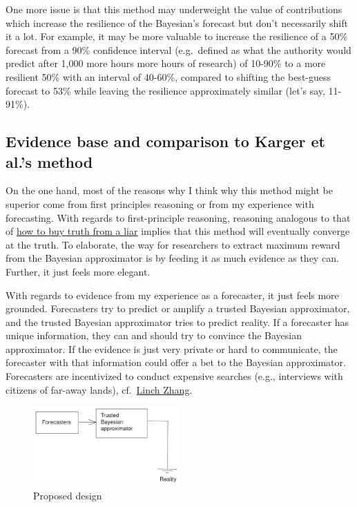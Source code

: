 \documentclass[]{article}
\begin{document}
One more issue is that this method may underweight the value of
contributions which increase the resilience of the Bayesian's forecast
but don't necessarily shift it a lot. For example, it may be more
valuable to increase the resilience of a 50\% forecast from a 90\%
confidence interval (e.g.~defined as what the authority would predict
after 1,000 more hours more hours of research) of 10-90\% to a more
resilient 50\% with an interval of 40-60\%, compared to shifting the
best-guess forecast to 53\% while leaving the resilience approximately
similar (let's say, 11-91\%).

\hypertarget{evidence-base-and-comparison-to-karger-et-al.s-method}{%
\subsection{Evidence base and comparison to Karger et al.'s
method}\label{evidence-base-and-comparison-to-karger-et-al.s-method}}

On the one hand, most of the reasons why I think why this method might
be superior come from first principles reasoning or from my experience
with forecasting. With regards to first-principle reasoning, reasoning
analogous to that of
\href{https://meteuphoric.com/2014/07/21/how-to-buy-a-truth-from-a-liar/}{how
to buy truth from a liar} implies that this method will eventually
converge at the truth. To elaborate, the way for researchers to extract
maximum reward from the Bayesian approximator is by feeding it as much
evidence as they can. Further, it just feels more elegant.

With regards to evidence from my experience as a forecaster, it just
feels more grounded. Forecasters try to predict or amplify a trusted
Bayesian approximator, and the trusted Bayesian approximator tries to
predict reality. If a forecaster has unique information, they can and
should try to convince the Bayesian approximator. If the evidence is
just very private or hard to communicate, the forecaster with that
information could offer a bet to the Bayesian approximator. Forecasters
are incentivized to conduct expensive searches (e.g., interviews with
citizens of far-away lands),
cf.~\href{https://twitter.com/LinchZhang/status/1455759586158268417}{Linch
Zhang}.

\begin{figure}
\centering
\includegraphics[width=0.5\textwidth,height=\textheight]{diagrams/amplification-diagram-1.png}
\caption{Proposed design}
\end{figure}
\end{document}
